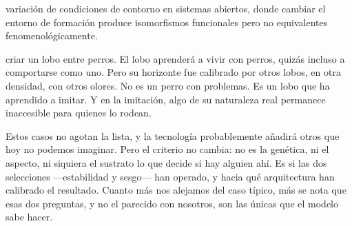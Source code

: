 \begin{fisica}
 variación de condiciones de contorno en sistemas abiertos, donde cambiar el entorno de formación produce isomorfismos funcionales pero no equivalentes fenomenológicamente.

 criar un lobo entre perros. El lobo aprenderá a vivir con perros, quizás incluso a comportarse como uno. Pero su horizonte fue calibrado por otros lobos, en otra densidad, con otros olores. No es un perro con problemas. Es un lobo que ha aprendido a imitar. Y en la imitación, algo de su naturaleza real permanece inaccesible para quienes lo rodean.
\end{fisica}

Estos casos no agotan la lista, y la tecnología probablemente añadirá otros que hoy no podemos imaginar. Pero el criterio no cambia: no es la genética, ni el aspecto, ni siquiera el sustrato lo que decide si hay alguien ahí. Es si las dos selecciones —estabilidad y sesgo— han operado, y hacia qué arquitectura han calibrado el resultado. Cuanto más nos alejamos del caso típico, más se nota que esas dos preguntas, y no el parecido con nosotros, son las únicas que el modelo sabe hacer.

